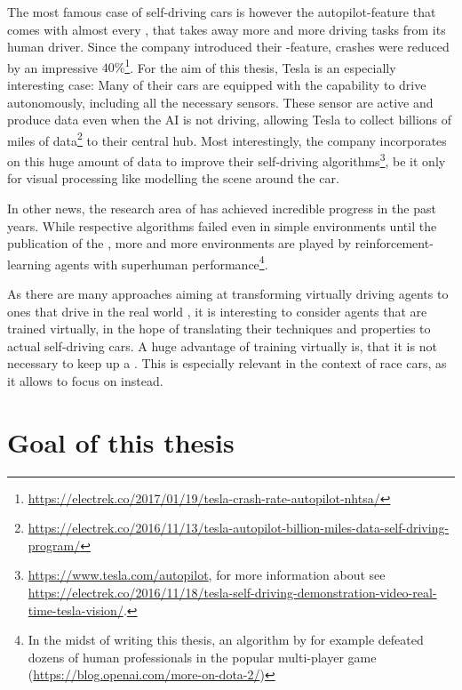The most famous case of self-driving cars is however the autopilot-feature that comes with almost every , that takes away more and more driving tasks from its human driver. Since the company introduced their -feature, crashes were reduced by an impressive $40\%$\footnote{\url{https://electrek.co/2017/01/19/tesla-crash-rate-autopilot-nhtsa/}}. For the aim of this thesis, Tesla is an especially interesting case: Many of their cars are equipped with the capability to drive autonomously, including all the necessary sensors. These sensor are active and produce data even when the AI is not driving, allowing Tesla to collect billions of miles of data\footnote{\url{https://electrek.co/2016/11/13/tesla-autopilot-billion-miles-data-self-driving-program/}} to their central hub. Most interestingly, the company incorporates  on this huge amount of data to improve their self-driving algorithms\footnote{\url{https://www.tesla.com/autopilot}, for more information about  see  \url{https://electrek.co/2016/11/18/tesla-self-driving-demonstration-video-real-time-tesla-vision/}.}, be it only for visual processing like modelling the scene around the car.

In other news, the research area of  has achieved incredible progress in the past years. While respective algorithms failed even in simple environments until the publication of the \cite{mnih_playing_2013}, more and more environments are played by reinforcement-learning agents with superhuman performance\footnote{In the midst of writing this thesis, an algorithm by  for example defeated dozens of human professionals in the popular multi-player game  (\url{https://blog.openai.com/more-on-dota-2/})}. 

As there are many approaches aiming at transforming virtually driving agents to ones that drive in the real world \cite{you_virtual_2017}, it is interesting to consider agents that are trained virtually, in the hope of translating their techniques and properties to actual self-driving cars. A huge advantage of training virtually is, that it is not necessary to keep up a . This is especially relevant in the context of race cars, as it allows to focus on  instead.

\section{Goal of this thesis}

